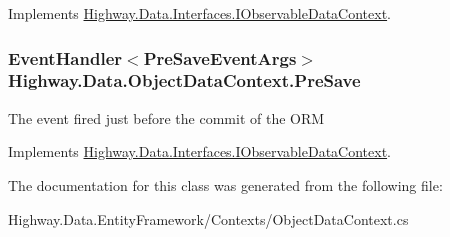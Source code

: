 Implements \hyperlink{interface_highway_1_1_data_1_1_interfaces_1_1_i_observable_data_context_a1978b914f7b94a37a6e86f3314326ca9}{Highway.\-Data.\-Interfaces.\-I\-Observable\-Data\-Context}.

\hypertarget{class_highway_1_1_data_1_1_object_data_context_a58b23aa4f60cbcee50ccf12ebcf20d82}{
\subsubsection[{Pre\-Save}]{\setlength{\rightskip}{0pt plus 5cm}Event\-Handler$<${\bf Pre\-Save\-Event\-Args}$>$ Highway.\-Data.\-Object\-Data\-Context.\-Pre\-Save}}\label{class_highway_1_1_data_1_1_object_data_context_a58b23aa4f60cbcee50ccf12ebcf20d82}


The event fired just before the commit of the O\-R\-M 



Implements \hyperlink{interface_highway_1_1_data_1_1_interfaces_1_1_i_observable_data_context_add85ecbc05ebf7174003841bdbd72dfe}{Highway.\-Data.\-Interfaces.\-I\-Observable\-Data\-Context}.



The documentation for this class was generated from the following file\-:\begin{DoxyCompactItemize}
\item 
Highway.\-Data.\-Entity\-Framework/\-Contexts/Object\-Data\-Context.\-cs\end{DoxyCompactItemize}
